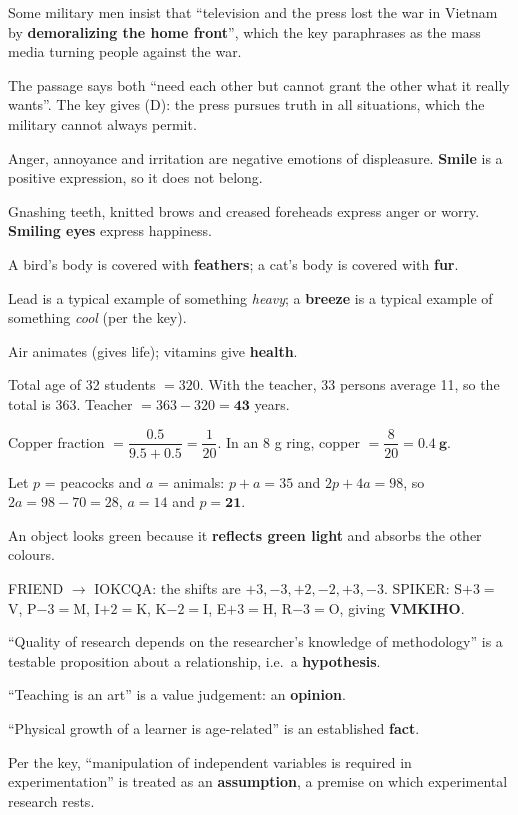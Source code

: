 Some military men insist that ``television and the press lost the war in Vietnam by \textbf{demoralizing the home front}'', which the key paraphrases as the mass media turning people against the war.

The passage says both ``need each other but cannot grant the other what it really wants''. The key gives (D): the press pursues truth in all situations, which the military cannot always permit.

Anger, annoyance and irritation are negative emotions of displeasure. \textbf{Smile} is a positive expression, so it does not belong.

Gnashing teeth, knitted brows and creased foreheads express anger or worry. \textbf{Smiling eyes} express happiness.

A bird's body is covered with \textbf{feathers}; a cat's body is covered with \textbf{fur}.

Lead is a typical example of something \emph{heavy}; a \textbf{breeze} is a typical example of something \emph{cool} (per the key).

Air animates (gives life); vitamins give \textbf{health}.

Total age of 32 students $=320$. With the teacher, 33 persons average 11, so the total is $363$. Teacher $=363-320=\mathbf{43}$ years.

Copper fraction $=\dfrac{0.5}{9.5+0.5}=\dfrac{1}{20}$. In an 8 g ring, copper $=\dfrac{8}{20}=\mathbf{0.4\ g}$.

Let $p$ = peacocks and $a$ = animals: $p+a=35$ and $2p+4a=98$, so $2a=98-70=28$, $a=14$ and $p=\mathbf{21}$.

An object looks green because it \textbf{reflects green light} and absorbs the other colours.

FRIEND $\rightarrow$ IOKCQA: the shifts are $+3, -3, +2, -2, +3, -3$.
SPIKER: S$+3=$V, P$-3=$M, I$+2=$K, K$-2=$I, E$+3=$H, R$-3=$O, giving \textbf{VMKIHO}.

``Quality of research depends on the researcher's knowledge of methodology'' is a testable proposition about a relationship, i.e.\ a \textbf{hypothesis}.

``Teaching is an art'' is a value judgement: an \textbf{opinion}.

``Physical growth of a learner is age-related'' is an established \textbf{fact}.

Per the key, ``manipulation of independent variables is required in experimentation'' is treated as an \textbf{assumption}, a premise on which experimental research rests.

